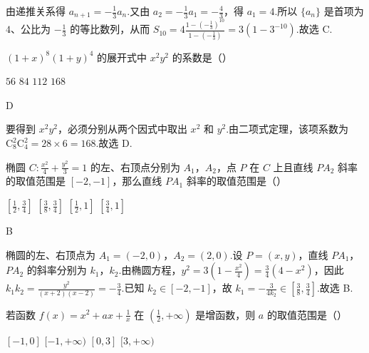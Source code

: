 \begin{solution}
由递推关系得 \(a_{n+1}=-\frac{1}{3}a_n\).又由 \(a_2=-\frac{1}{3}a_1=-\frac{4}{3}\)，得 \(a_1=4\).所以 \(\{a_n\}\) 是首项为 \(4\)、公比为 \(-\frac{1}{3}\) 的等比数列，从而 \(S_{10}=4\frac{1-\left(-\frac{1}{3}\right)^{10}}{1-\left(-\frac{1}{3}\right)}=3(1-3^{-10})\).故选 C.
\end{solution}

\begin{problem}
\((1+x)^8(1+y)^4\) 的展开式中 \(x^2y^2\) 的系数是（\quad）

\choices
    {\(56\)}
    {\(84\)}
    {\(112\)}
    {\(168\)}
\end{problem}

\begin{answer}
D
\end{answer}

\begin{solution}
要得到 \(x^2y^2\)，必须分别从两个因式中取出 \(x^2\) 和 \(y^2\).由二项式定理，该项系数为 \(\mathrm C_8^2\mathrm C_4^2=28\times6=168\).故选 D.
\end{solution}

\begin{problem}
椭圆 \(C:\frac{x^2}{4}+\frac{y^2}{3}=1\) 的左、右顶点分别为 \(A_1\)，\(A_2\)，点 \(P\) 在 \(C\) 上且直线 \(PA_2\) 斜率的取值范围是 \([-2,-1]\)，那么直线 \(PA_1\) 斜率的取值范围是（\quad）

\choices
    {\(\left[\frac{1}{2},\frac{3}{4}\right]\)}
    {\(\left[\frac{3}{8},\frac{3}{4}\right]\)}
    {\(\left[\frac{1}{2},1\right]\)}
    {\(\left[\frac{3}{4},1\right]\)}
\end{problem}

\begin{answer}
B
\end{answer}

\begin{solution}
椭圆的左、右顶点为 \(A_1=(-2,0)\)，\(A_2=(2,0)\).设 \(P=(x,y)\)，直线 \(PA_1\)，\(PA_2\) 的斜率分别为 \(k_1\)，\(k_2\).由椭圆方程，\(y^2=3\left(1-\frac{x^2}{4}\right)=\frac{3}{4}(4-x^2)\)，因此 \(k_1k_2=\frac{y^2}{(x+2)(x-2)}=-\frac{3}{4}\).已知 \(k_2\in[-2,-1]\)，故 \(k_1=-\frac{3}{4k_2}\in\left[\frac{3}{8},\frac{3}{4}\right]\).故选 B.
\end{solution}

\begin{problem}
若函数 \(f(x)=x^2+ax+\frac{1}{x}\) 在 \(\left(\frac{1}{2},+\infty\right)\) 是增函数，则 \(a\) 的取值范围是（\quad）

\choices
    {\([-1,0]\)}
    {\([-1,+\infty)\)}
    {\([0,3]\)}
    {\([3,+\infty)\)}
\end{problem}


